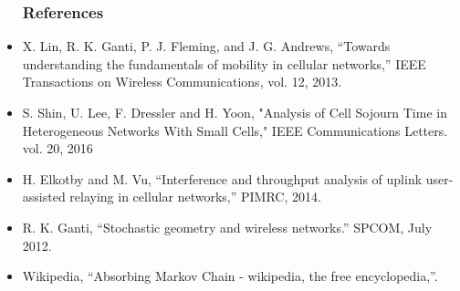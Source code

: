 \documentclass{beamer}
\begin{document}
\begin{frame}

\begin{itemize}
\frametitle{References} 
\item X. Lin, R. K. Ganti, P. J. Fleming, and J. G. Andrews, “Towards understanding
the fundamentals of mobility in cellular networks,” IEEE Transactions on Wireless
Communications, vol. 12, 2013.

\item S. Shin, U. Lee, F. Dressler and H. Yoon, "Analysis of Cell Sojourn Time in Heterogeneous Networks With Small Cells," IEEE Communications Letters. vol. 20, 2016

\item H. Elkotby and M. Vu, “Interference and throughput analysis of uplink user-assisted
relaying in cellular networks,” PIMRC, 2014.

\item R. K. Ganti, “Stochastic geometry and wireless networks.” SPCOM, July 2012.

\item Wikipedia, “Absorbing Markov Chain - wikipedia, the free encyclopedia,”.

\end{itemize}
\end{frame}
\end{document}
